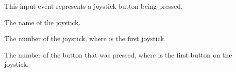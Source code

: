 \documentclass[letterpaper,10pt,english]{sphinxmanual}
\begin{document}

\begin{fulllineitems}
\label{input:sge.input.JoystickButtonPress}
This input event represents a joystick button being pressed.

\begin{fulllineitems}
\label{input:sge.input.JoystickButtonPress.js_name}
The name of the joystick.

\end{fulllineitems}


\begin{fulllineitems}
\label{input:sge.input.JoystickButtonPress.js_id}
The number of the joystick, where  is the first joystick.

\end{fulllineitems}


\begin{fulllineitems}
\label{input:sge.input.JoystickButtonPress.button}
The number of the button that was pressed, where  is the
first button on the joystick.

\end{fulllineitems}


\end{fulllineitems}

\end{document}
